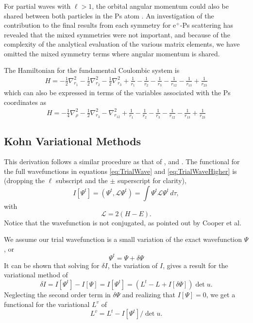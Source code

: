 \documentclass[preprint,showpacs,preprintnumbers,amsmath,amssymb]{revtex4}
\newcommand{\beq}{\begin{equation}}
\newcommand{\eeq}{\end{equation}}
\begin{document}
For partial waves with $\ell>1$, the orbital angular momentum could also be shared between both particles in the Ps atom \cite{Schwartz1961a}. An investigation of the contribution to the final results from each symmetry for e$^+$-Ps scattering \cite{VanReeth1997} has revealed that the mixed symmetries were not important, and because of the complexity of the analytical evaluation of the various matrix elements, we have omitted the mixed symmetry terms where angular momentum is shared.

The Hamiltonian for the fundamental Coulombic system is
\begin{align}
H = -\frac{1}{2} \nabla_{r_1}^2 - \frac{1}{2} \nabla_{r_2}^2 - \frac{1}{2} \nabla_{r_3}^2 + \frac {1}{r_1}-\frac {1}{r_2}-\frac {1}{r_3}-\frac {1}{r_{12}}-\frac {1}{r_{13}}+\frac {1}{r_{23}}
	\label{Hamiltonian1}
\end{align}
which can also be expressed in terms of the variables associated with the Ps coordinates as
\begin{align}
H = -\frac{1}{4} \nabla_{\rho}^2 - \frac{1}{2} \nabla_{r_3}^2 - \nabla_{r_{12}}^2 + \frac {1}{r_1}-\frac {1}{r_2}-\frac {1}{r_3}-\frac {1}{r_{12}}-\frac {1}{r_{13}}+\frac {1}{r_{23}}
	\label{Hamiltonian2}
\end{align}


\subsection{Kohn Variational Methods}
\label{sec:Kohn}

This derivation follows a similar procedure as that of \cite{Lucchese1989}, \cite{Cooper2010} and \cite{Armour1991}.
The functional for the full wavefunctions in equations \ref{eq:TrialWave} and \ref{eq:TrialWaveHigher} is (dropping the $\ell$ subscript and the $\pm$ superscript for clarity),
\begin{equation}
I[\Psi^t] = \left(\Psi^t, \mathcal{L} \Psi^t \right) = \int \Psi^t \mathcal{L} \Psi^t \,d\tau,
\label{eq:IlDefPsi}
\end{equation}
with
\beq
\mathcal{L} = 2(H - E).
\label{eq:LDef}
\eeq
Notice that the wavefunction is not conjugated, as pointed out by Cooper et al. \cite{Cooper2010}

We assume our trial wavefunction is a small variation of the exact wavefunction $\Psi$, or
\beq
\Psi^t = \Psi + \delta \Psi
\label{eq:PsiTrialRelation}
\eeq
It can be shown that solving for $\delta I$, the variation of $I$, gives a result for the variational method of
\beq
\delta I = I[\Psi^t] - I[\Psi] = I[\Psi^t] = (L^t - L + I[\delta \Psi]) \det u.
\label{eq:IlPsiVariation}
\eeq
Neglecting the second order term in $\delta \Psi$ and realizing that $I[\Psi] = 0$, we get a functional for the variational $L^v$ of
\beq
L^v = L^t - I[\Psi^t] / \det u.
\label{eq:ComplexKohnVariation}
\eeq
\end{document}
